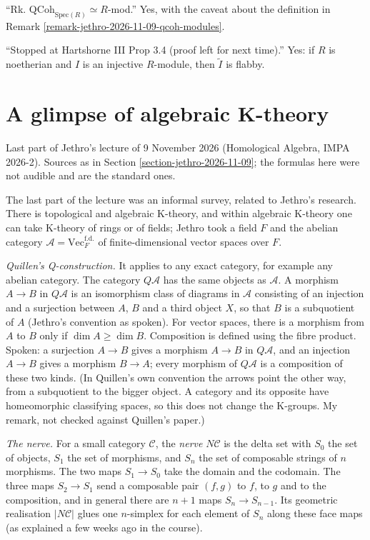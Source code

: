 ``Rk. $\mathrm{QCoh}_{\mathrm{Spec}(R)}\simeq
R$-mod.'' Yes, with the caveat about the
definition in Remark
\ref{remark-jethro-2026-11-09-qcoh-modules}.

``Stopped at Hartshorne III Prop 3.4 (proof
left for next time).'' Yes: if $R$ is
noetherian and $I$ is an injective
$R$-module, then $\widetilde{I}$ is flabby.

\section{A glimpse of algebraic K-theory}
\label{section-algebraic-k-theory-glimpse}

Last part of Jethro's lecture of 9 November
2026 (Homological Algebra, IMPA 2026-2).
Sources as in Section
\ref{section-jethro-2026-11-09}; the
formulas here were not audible and are the
standard ones.

The
last part of the lecture was an informal
survey, related to Jethro's research. There
is topological and algebraic K-theory, and
within algebraic K-theory one can take
K-theory of rings or of fields; Jethro took a
field $F$ and the abelian category
$\mathcal{A}=\mathrm{Vec}_F^{\mathrm{f.d.}}$
of finite-dimensional vector spaces over $F$.

\textit{Quillen's Q-construction.} It applies
to any exact category, for example any
abelian category. The category
$Q\mathcal{A}$ has the same objects as
$\mathcal{A}$. A morphism $A\to B$ in
$Q\mathcal{A}$ is an isomorphism class of
diagrams in $\mathcal{A}$ consisting of an
injection and a surjection between $A$, $B$
and a third object $X$, so that $B$ is a
subquotient of $A$ (Jethro's convention as
spoken). For vector spaces, there is a
morphism from $A$ to $B$ only if
$\dim A\geq\dim B$. Composition is defined
using the fibre product. Spoken: a surjection
$A\to B$ gives a morphism $A\to B$ in
$Q\mathcal{A}$, and an injection $A\to B$
gives a morphism $B\to A$; every morphism of
$Q\mathcal{A}$ is a composition of these two
kinds. (In Quillen's own convention the
arrows point the other way, from a
subquotient to the bigger object. A category
and its opposite have homeomorphic
classifying spaces, so this does not change
the K-groups. My remark, not checked against
Quillen's paper.)

\textit{The nerve.} For a small category
$\mathcal{C}$, the \textit{nerve}
$N\mathcal{C}$ is the delta set with $S_0$
the set of objects, $S_1$ the set of
morphisms, and $S_n$ the set of composable
strings of $n$ morphisms. The two maps
$S_1\to S_0$ take the domain and the
codomain. The three maps $S_2\to S_1$ send a
composable pair $(f,g)$ to $f$, to $g$ and to
the composition, and in general there are
$n+1$ maps $S_n\to S_{n-1}$. Its geometric
realisation $|N\mathcal{C}|$ glues one
$n$-simplex for each element of $S_n$ along
these face maps (as explained a few weeks
ago in the course).

